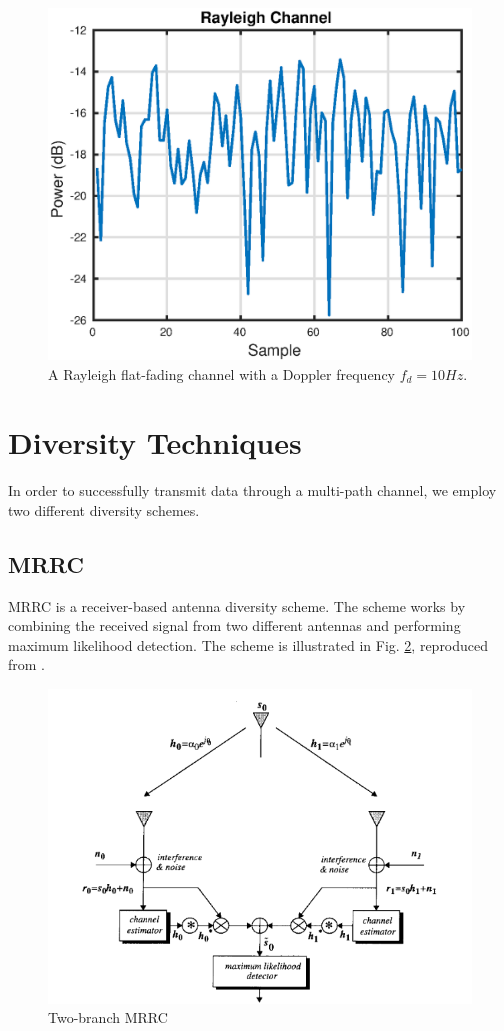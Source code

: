 \documentclass[conference]{IEEEtran}
\begin{document}
\begin{figure}[htbp]
\centerline{\includegraphics[scale=.5]{./media/raychan.eps}}
\caption{A Rayleigh flat-fading channel with a Doppler frequency $f_d = 10Hz$. }
\label{fig:ray}
\end{figure}

\section{Diversity Techniques}
In order to successfully transmit data through a multi-path channel, we employ two different diversity schemes.
\subsection{MRRC}
MRRC is a receiver-based antenna diversity scheme. The scheme works by combining the received signal from two different antennas and performing maximum likelihood detection. The scheme is illustrated in Fig. \ref{fig:mrrc}, reproduced from \cite{alamouti}. 
\begin{figure}[htbp]
\centerline{\includegraphics[scale=.4]{./media/mrrc.png}}
\caption{Two-branch MRRC}
\label{fig:mrrc}
\end{figure}
\end{document}
